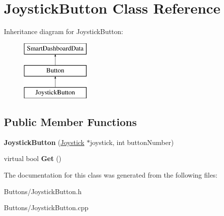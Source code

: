 \hypertarget{classJoystickButton}{
\section{JoystickButton Class Reference}
\label{classJoystickButton}
}
Inheritance diagram for JoystickButton:\begin{figure}[H]
\begin{center}
\leavevmode
\includegraphics[height=3.000000cm]{classJoystickButton}
\end{center}
\end{figure}
\subsection*{Public Member Functions}
\begin{DoxyCompactItemize}
\item 
\hypertarget{classJoystickButton_af9a70d41fac8493bb100940475767d93}{
{\bfseries JoystickButton} (\hyperlink{classJoystick}{Joystick} $\ast$joystick, int buttonNumber)}
\label{classJoystickButton_af9a70d41fac8493bb100940475767d93}

\item 
\hypertarget{classJoystickButton_a5a603b7982bc87b33a014676467c2f70}{
virtual bool {\bfseries Get} ()}
\label{classJoystickButton_a5a603b7982bc87b33a014676467c2f70}

\end{DoxyCompactItemize}


The documentation for this class was generated from the following files:\begin{DoxyCompactItemize}
\item 
Buttons/JoystickButton.h\item 
Buttons/JoystickButton.cpp\end{DoxyCompactItemize}
